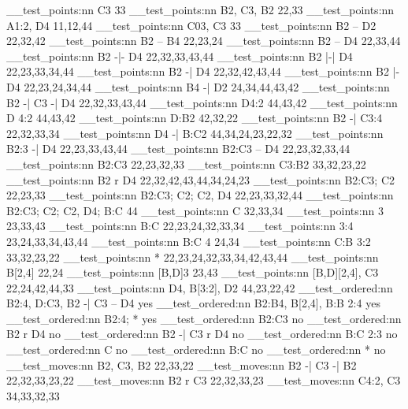 	\__test_points:nn {C3} {{3}{3}}
	\__test_points:nn {B2, C3, B2} {{2}{2},{3}{3}}
	\__test_points:nn {A1:2, D4} {{1}{1},{1}{2},{4}{4}}
	\__test_points:nn {C03, C3} {{3}{3}}
	\__test_points:nn {B2 -- D2} {{2}{2},{3}{2},{4}{2}}
	\__test_points:nn {B2 -- B4} {{2}{2},{2}{3},{2}{4}}
	\__test_points:nn {B2 -- D4} {{2}{2},{3}{3},{4}{4}}
	\__test_points:nn {B2 -|- D4} {{2}{2},{3}{2},{3}{3},{4}{3},{4}{4}}
	\__test_points:nn {B2 |-| D4} {{2}{2},{2}{3},{3}{3},{3}{4},{4}{4}}
	\__test_points:nn {B2 -| D4} {{2}{2},{3}{2},{4}{2},{4}{3},{4}{4}}
	\__test_points:nn {B2 |- D4} {{2}{2},{2}{3},{2}{4},{3}{4},{4}{4}}
	\__test_points:nn {B4 -| D2} {{2}{4},{3}{4},{4}{4},{4}{3},{4}{2}}
	\__test_points:nn {B2 -| C3 -| D4} {{2}{2},{3}{2},{3}{3},{4}{3},{4}{4}}
	\__test_points:nn {D4:2} {{4}{4},{4}{3},{4}{2}}
	\__test_points:nn {D 4:2} {{4}{4},{4}{3},{4}{2}}
	\__test_points:nn {D:B2} {{4}{2},{3}{2},{2}{2}}
	\__test_points:nn {B2 -| C3:4} {{2}{2},{3}{2},{3}{3},{3}{4}}
	\__test_points:nn {D4 -| B:C2} {{4}{4},{3}{4},{2}{4},{2}{3},{2}{2},{3}{2}}
	\__test_points:nn {B2:3 -| D4} {{2}{2},{2}{3},{3}{3},{4}{3},{4}{4}}
	\__test_points:nn {B2:C3 -- D4} {{2}{2},{2}{3},{3}{2},{3}{3},{4}{4}}
	\__test_points:nn {B2:C3} {{2}{2},{2}{3},{3}{2},{3}{3}}
	\__test_points:nn {C3:B2} {{3}{3},{3}{2},{2}{3},{2}{2}}
	\__test_points:nn {B2 r D4} {{2}{2},{3}{2},{4}{2},{4}{3},{4}{4},{3}{4},{2}{4},{2}{3}}
	\__test_points:nn {B2:C3; C2} {{2}{2},{2}{3},{3}{3}}
	\__test_points:nn {B2:C3; C2; C2, D4} {{2}{2},{2}{3},{3}{3},{3}{2},{4}{4}}
	\__test_points:nn {B2:C3; C2; C2, D4; B:C} {{4}{4}}
	\__test_points:nn {C} {{3}{2},{3}{3},{3}{4}}
	\__test_points:nn {3} {{2}{3},{3}{3},{4}{3}}
	\__test_points:nn {B:C} {{2}{2},{2}{3},{2}{4},{3}{2},{3}{3},{3}{4}}
	\__test_points:nn {3:4} {{2}{3},{2}{4},{3}{3},{3}{4},{4}{3},{4}{4}}
	\__test_points:nn {B:C 4} {{2}{4},{3}{4}}
	\__test_points:nn {C:B 3:2} {{3}{3},{3}{2},{2}{3},{2}{2}}
	\__test_points:nn {*} {{2}{2},{2}{3},{2}{4},{3}{2},{3}{3},{3}{4},{4}{2},{4}{3},{4}{4}}
	\__test_points:nn {B[2,4]} {{2}{2},{2}{4}}
	\__test_points:nn {[B,D]3} {{2}{3},{4}{3}}
	\__test_points:nn {[B,D][2,4], C3} {{2}{2},{2}{4},{4}{2},{4}{4},{3}{3}}
	\__test_points:nn {D4, B[3:2], D2} {{4}{4},{2}{3},{2}{2},{4}{2}}
	\__test_ordered:nn {B2:4, D:C3, B2 -| C3 -- D4} {yes}
	\__test_ordered:nn {B2:B4, B[2,4], B:B 2:4} {yes}
	\__test_ordered:nn {B2:4; *} {yes}
	\__test_ordered:nn {B2:C3} {no}
	\__test_ordered:nn {B2 r D4} {no}
	\__test_ordered:nn {B2 -| C3 r D4} {no}
	\__test_ordered:nn {B:C 2:3} {no}
	\__test_ordered:nn {C} {no}
	\__test_ordered:nn {B:C} {no}
	\__test_ordered:nn {*} {no}
	\__test_moves:nn {B2, C3, B2} {{2}{2},{3}{3},{2}{2}}
	\__test_moves:nn {B2 -| C3 -| B2} {{2}{2},{3}{2},{3}{3},{2}{3},{2}{2}}
	\__test_moves:nn {B2 r C3} {{2}{2},{3}{2},{3}{3},{2}{3}}
	\__test_moves:nn {C4:2, C3} {{3}{4},{3}{3},{3}{2},{3}{3}}

